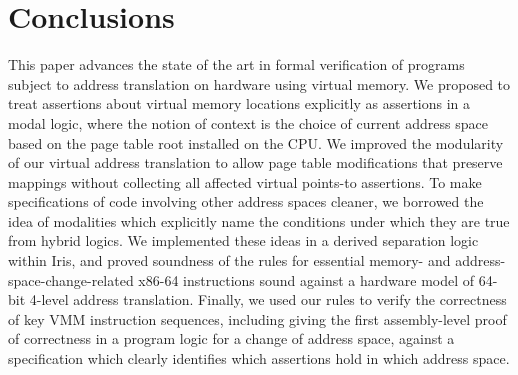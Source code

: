 \documentclass[acmsmall,screen,nonacm]{acmart}
\begin{document}
 \section{Conclusions}
This paper advances the state of the art in formal verification of programs subject to address translation
on hardware using virtual memory. We proposed to treat assertions about virtual
memory locations explicitly as assertions in a modal logic, where the notion of context
is the choice of current address space based on the page table root installed on the CPU.
We improved the modularity of our virtual address translation to allow page table modifications that
preserve mappings without collecting all affected virtual points-to assertions.
To make specifications of code involving other address spaces cleaner, we borrowed the idea of
modalities which explicitly name the conditions under which they are true from hybrid logics.
We implemented these ideas in a derived separation logic within Iris, and proved soundness of
the rules for essential memory- and address-space-change-related x86-64 instructions 
sound against a hardware model of 64-bit 4-level address translation.
Finally, we used our rules to verify the correctness of key VMM instruction sequences,
including giving the first assembly-level proof of correctness in a program logic for a change
of address space, against a specification which clearly identifies which assertions hold in which address space.
%
%
%
%

%
%


\end{document}
